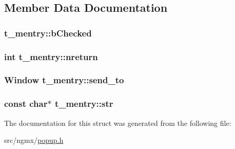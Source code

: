 \subsection{\-Member \-Data \-Documentation}
\hypertarget{structt__mentry_a1c0a7cb00ce40aa6778b830a807a08d1}{
\subsubsection[{b\-Checked}]{ {\bf t\-\_\-mentry\-::b\-Checked}}}\label{structt__mentry_a1c0a7cb00ce40aa6778b830a807a08d1}
\hypertarget{structt__mentry_a6269117915f259f39466f61b69e2d93f}{
\subsubsection[{nreturn}]{\setlength{\rightskip}{0pt plus 5cm}int {\bf t\-\_\-mentry\-::nreturn}}}\label{structt__mentry_a6269117915f259f39466f61b69e2d93f}
\hypertarget{structt__mentry_a658ff5ee36ab0b7fe0182c437c7a8ae3}{
\subsubsection[{send\-\_\-to}]{\setlength{\rightskip}{0pt plus 5cm}\-Window {\bf t\-\_\-mentry\-::send\-\_\-to}}}\label{structt__mentry_a658ff5ee36ab0b7fe0182c437c7a8ae3}
\hypertarget{structt__mentry_ae41ed23d573834aa0cbc4abb129135bd}{
\subsubsection[{str}]{\setlength{\rightskip}{0pt plus 5cm}const char$\ast$ {\bf t\-\_\-mentry\-::str}}}\label{structt__mentry_ae41ed23d573834aa0cbc4abb129135bd}


\-The documentation for this struct was generated from the following file\-:\begin{DoxyCompactItemize}
\item 
src/ngmx/\hyperlink{popup_8h}{popup.\-h}\end{DoxyCompactItemize}
